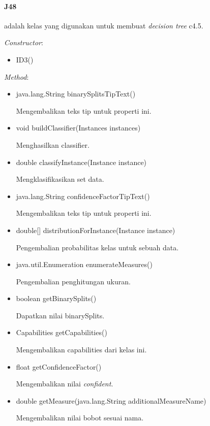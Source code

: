 \paragraph{J48} adalah kelas yang digunakan untuk membuat \textsl{decision tree} c4.5.

\textsl{Constructor}:
\begin{itemize}
	\item ID3()
\end{itemize}
\textsl{Method}:
\begin{itemize}
	\item java.lang.String binarySplitsTipText()
	
	Mengembalikan teks tip untuk properti ini.
	
	\item void buildClassifier(Instances instances)
	
	Menghasilkan classifier.
	
	\item double classifyInstance(Instance instance)
	
	Mengklasifikasikan set data.
	
	\item java.lang.String confidenceFactorTipText()
	
	Mengembalikan teks tip untuk properti ini.
	
	\item double[] distributionForInstance(Instance instance)
	
	Pengembalian probabilitas kelas untuk sebuah data.
	
	\item java.util.Enumeration enumerateMeasures()
	
	Pengembalian penghitungan ukuran.
	
	\item boolean getBinarySplits()
	
	Dapatkan nilai binarySplits.
	
	\item Capabilities getCapabilities()
	
	Mengembalikan capabilities dari kelas ini.
	
	\item float getConfidenceFactor()
	
	Mengembalikan nilai \textsl{confident}.
	
	\item double getMeasure(java.lang.String additionalMeasureName)
	
	Mengembalikan nilai bobot sesuai nama.
	

\end{itemize}
